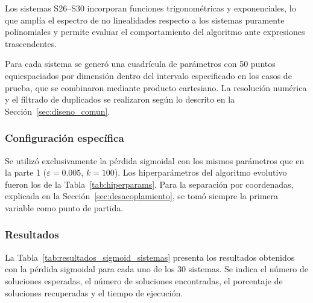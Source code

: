 \documentclass{article} \usepackage[utf8]{inputenc} \usepackage[spanish]{babel} \usepackage{amsmath, amssymb, amsthm} \usepackage{bm} \usepackage{float} \usepackage{longtable} \usepackage[hidelinks]{hyperref} \spanishdecimal{.}
\begin{document}
Los sistemas S26--S30 incorporan funciones trigonométricas y exponenciales, lo que amplía el espectro de no linealidades respecto a los sistemas puramente polinomiales y permite evaluar el comportamiento del algoritmo ante expresiones trascendentes.

Para cada sistema se generó una cuadrícula de parámetros con 50 puntos equiespaciados por dimensión dentro del intervalo especificado en los casos de prueba, que se combinaron mediante producto cartesiano.  La resolución numérica y el filtrado de duplicados se realizaron según lo descrito en la Sección~\ref{sec:diseno_comun}.

\subsubsection{Configuración específica}

Se utilizó exclusivamente la pérdida sigmoidal con los mismos parámetros que en la parte 1 ($\varepsilon = 0.005$, $k = 100$). Los hiperparámetros del algoritmo evolutivo fueron los de la Tabla~\ref{tab:hiperparams}. Para la separación por coordenadas, explicada en la Sección~\ref{sec:desacoplamiento}, se tomó siempre la primera variable como punto de partida.

\subsubsection{Resultados} \label{sec:resultados_fase2}

La Tabla~\ref{tab:resultados_sigmoid_sistemas} presenta los resultados obtenidos con la pérdida sigmoidal para cada uno de los 30 sistemas. Se indica el número de soluciones esperadas, el número de soluciones encontradas, el porcentaje de soluciones recuperadas y el tiempo de ejecución.
\end{document}
